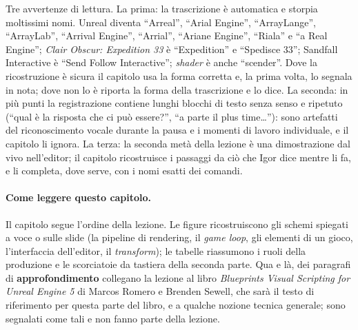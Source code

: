Tre avvertenze di lettura. La prima: la trascrizione è automatica e storpia moltissimi
nomi. Unreal diventa ``Arreal'', ``Arial Engine'', ``ArrayLange'', ``ArrayLab'',
``Arrival Engine'', ``Arrial'', ``Ariane Engine'', ``Riala'' e ``a Real Engine'';
\emph{Clair Obscur: Expedition 33} è ``Expedition'' e ``Spedisce 33''; Sandfall
Interactive è ``Send Follow Interactive''; \emph{shader} è anche ``scender''. Dove la
ricostruzione è sicura il capitolo usa la forma corretta e, la prima volta, lo segnala
in nota; dove non lo è riporta la forma della trascrizione e lo dice. La seconda: in
più punti la registrazione contiene lunghi blocchi di testo senza senso e ripetuto
(``qual è la risposta che ci può essere?'', ``a parte il plus time\ldots''): sono
artefatti del riconoscimento vocale durante la pausa e i momenti di lavoro
individuale, e il capitolo li ignora. La terza: la seconda metà della lezione è una
dimostrazione dal vivo nell'editor; il capitolo ricostruisce i passaggi da ciò che Igor
dice mentre li fa, e li completa, dove serve, con i nomi esatti dei comandi.

\paragraph{Come leggere questo capitolo.} Il capitolo segue l'ordine della lezione.
Le figure ricostruiscono gli schemi spiegati a voce o sulle slide (la pipeline di
rendering, il \emph{game loop}, gli elementi di un gioco, l'interfaccia dell'editor,
il \emph{transform}); le tabelle riassumono i ruoli della produzione e le scorciatoie
da tastiera della seconda parte. Qua e là, dei paragrafi di \textbf{approfondimento}
collegano la lezione al libro \emph{Blueprints Visual Scripting for Unreal Engine 5}
di Marcos Romero e Brenden Sewell, che sarà il testo di riferimento per questa parte
del libro, e a qualche nozione tecnica generale; sono segnalati come tali e non fanno
parte della lezione.


